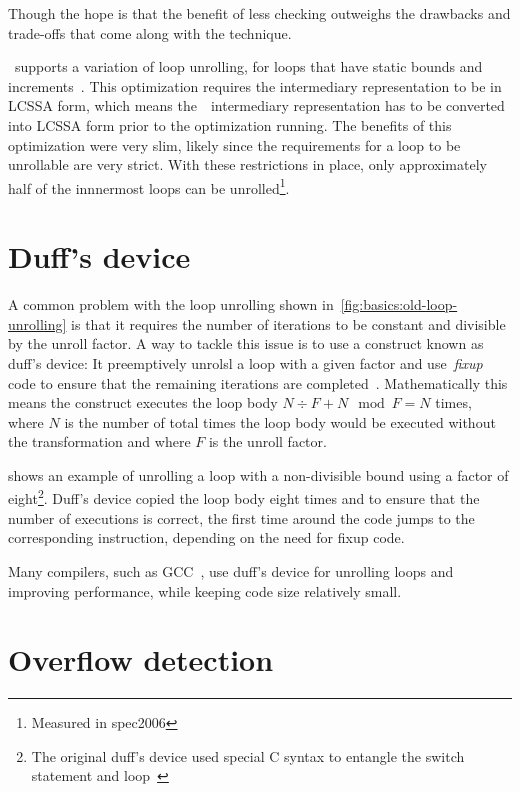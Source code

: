 Though the hope is that the benefit of less checking outweighs the drawbacks and trade-offs that come along with the technique.

\libFIRM~supports a variation of loop unrolling, for loops that have static bounds and increments~\cite{aebi18bachelorarbeit}.
This optimization requires the intermediary representation to be in LCSSA form, which means the~\libFIRM~intermediary representation has to be converted into LCSSA form prior to the optimization running\cite{aebi18bachelorarbeit}.
The benefits of this optimization were very slim, likely since the requirements for a loop to be unrollable are very strict.
With these restrictions in place, only approximately half of the innnermost loops can be unrolled\footnote{Measured in spec2006}.




\section{Duff's device}\label{sec:basics:duffs}

A common problem with the loop unrolling shown in~\cref{fig:basics:old-loop-unrolling} is that it requires the number of iterations to be constant and divisible by the unroll factor.
A way to tackle this issue is to use a construct known as duff's device: It preemptively unrolsl a loop with a given factor and use~\textit{fixup} code to ensure that the remaining iterations are completed~\cite{duff_1983}.
Mathematically this means the construct executes the loop body $N \div F + N \mod F = N$ times, where $N$ is the number of total times the loop body would be executed without the transformation and where $F$ is the unroll factor.

 shows an example of unrolling a loop with a non-divisible bound using a factor of eight\footnote{The original duff's device used special C syntax to entangle the switch statement and loop~\cite{duff_1983}}.
Duff's device copied the loop body eight times and to ensure that the number of executions is correct, the first time around the code jumps to the corresponding instruction, depending on the need for fixup code.

Many compilers, such as GCC~\cite{gcc}, use duff's device for unrolling loops and improving performance, while keeping code size relatively small.



\section{Overflow detection}\label{sec:basics:overflow}

